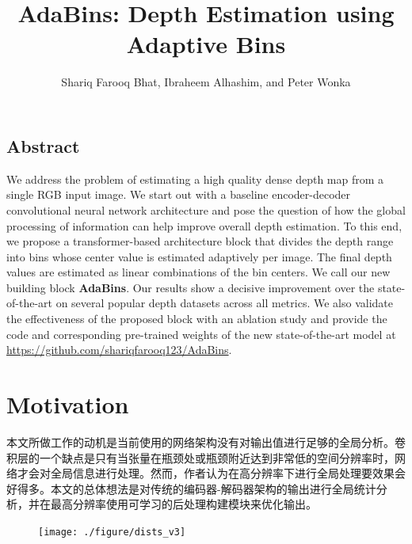 \documentclass{vip-theme}
\title{AdaBins: Depth Estimation using Adaptive Bins}
\author{
	Shariq Farooq Bhat, Ibraheem Alhashim, and Peter Wonka %
}
\begin{document}
\maketitle
\label{title}

\vspace{0.5em}
\subsection*{Abstract} 
\label{abstract}
We address the problem of estimating a high quality dense depth map from a single RGB input image. We start out with a baseline encoder-decoder convolutional neural network architecture and pose the question of how the global processing of information can help improve overall depth estimation. To this end, we propose a transformer-based architecture block that divides the depth range into bins whose center value is estimated adaptively per image. The final depth values are estimated as linear combinations of the bin centers. We call our new building block {\bfseries{AdaBins}}. Our results show a decisive improvement over the state-of-the-art on several popular depth datasets across all metrics. We also validate the effectiveness of the proposed block with an ablation study and provide the code and corresponding pre-trained weights of the new state-of-the-art model at \href{https://github.com/shariqfarooq123/AdaBins}{\color{vipblue}https://github.com/shariqfarooq123/AdaBins}.

\section{Motivation}
\label{motivation}

本文所做工作的动机是当前使用的网络架构没有对输出值进行足够的全局分析。卷积层的一个缺点是只有当张量在瓶颈处或瓶颈附近达到非常低的空间分辨率时，网络才会对全局信息进行处理。然而，作者认为在高分辨率下进行全局处理要效果会好得多。本文的总体想法是对传统的编码器-解码器架构的输出进行全局统计分析，并在最高分辨率使用可学习的后处理构建模块来优化输出。

\begin{figure}[!htbp]
\centering
    \texttt{[image: ./figure/dists\_v3]}
\end{figure}
\end{document}
